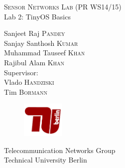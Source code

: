 \documentclass[11pt]{article} %
\begin{document}

\begin{titlepage}
\begin{center}


\newcommand{\HRule}{\rule{\linewidth}{0.5mm}} %


\vspace{30 mm}

\textsc{\large Sensor Networks Lab (PR WS14/15) }\\[1cm] %

{\huge Lab 2: TinyOS Basics} \\[1cm] %

\begin{minipage}{0.5\textwidth}
\begin{flushleft}
\center
Sanjeet Raj \textsc{Pandey}\\
Sanjay Santhosh \textsc{Kumar}\\
Muhammad Tauseef \textsc{Khan}\\
Rajibul Alam \textsc{Khan}\\[2cm]

Supervisor: \\
Vlado \textsc{Handziski}\\ 
Tim \textsc{Bormann} \\
\vspace{30 mm}
\begin{figure}[H]
 \centering
 \includegraphics[width=2cm]{logo}
\end{figure}
Telecommunication Networks Group\\
Technical University Berlin\\ 
\end{flushleft}

\end{minipage} \\[1cm]
\end{center}

\vspace{30 mm}
\end{titlepage}
\end{document}
